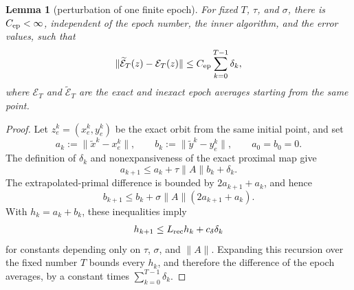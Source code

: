 \documentclass[letterpaper]{article} %
\newtheorem{lemma}[theorem]{Lemma} %
\theoremstyle{definition}
\theoremstyle{remark}
\begin{document}
\begingroup
\renewcommand{\thetheorem}{\epochperturbationnumber}
\begin{lemma}[perturbation of one finite epoch]
\label{lem:theory-epoch-perturbation}
For fixed $T$, $\tau$, and $\sigma$, there is
$C_{\rm ep}<\infty$, independent of the epoch number, the inner algorithm,
and the error values, such that
\begin{equation}
\label{eq:theory-epoch-perturbation}
    \|\widetilde{\mathcal E}_T(z)-\mathcal E_T(z)\|
    \le
    C_{\rm ep}\sum_{k=0}^{T-1}\delta_k,
\end{equation}
where $\mathcal E_T$ and $\widetilde{\mathcal E}_T$ are the exact and inexact
epoch averages starting from the same point.
\end{lemma}
\endgroup

\begin{proof}
Let $z_e^k=(x_e^k,y_e^k)$ be the exact orbit from the same initial point, and
set
\[
    a_k:=\|\widetilde x^k-x_e^k\|,
    \qquad
    b_k:=\|\widetilde y^k-y_e^k\|,
    \qquad
    a_0=b_0=0.
\]
The definition of $\delta_k$ and nonexpansiveness of the exact proximal map
give
\begin{equation}
\label{eq:theory-primal-perturbation}
    a_{k+1}
    \le
    a_k+\tau\|A\|b_k+\delta_k.
\end{equation}
The extrapolated-primal difference is bounded by
$2a_{k+1}+a_k$, and hence
\begin{equation}
\label{eq:theory-dual-perturbation}
    b_{k+1}
    \le
    b_k+\sigma\|A\|(2a_{k+1}+a_k).
\end{equation}
With $h_k=a_k+b_k$, these inequalities imply
\[
    h_{k+1}
    \le
    L_{\rm rec}h_k+c_\delta\delta_k
\]
for constants depending only on $\tau$, $\sigma$, and $\|A\|$.  Expanding
this recursion over the fixed number $T$ bounds every $h_k$, and therefore
the difference of the epoch averages, by a constant times
$\sum_{k=0}^{T-1}\delta_k$.
\end{proof}
\end{document}
